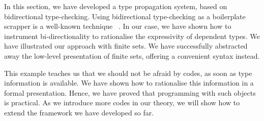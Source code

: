 In this section, we have developed a type propagation system, based
on bidirectional type-checking. Using bidirectional type-checking as a
boilerplate scrapper is a well-known technique~\cite{who?} . In our case, we have shown how to instrument
bi-directionality to rationalise the expressivity of dependent
types. We have illustrated our approach with finite sets. We have
successfully abstracted away the low-level presentation of finite
sets, offering a convenient syntax instead.

This example teaches us that we should not be afraid by codes, as soon
as type information is available. We have shown how to rationalise
this information in a formal presentation. Hence, we have proved that
programming with such objects is practical. As we introduce more codes
in our theory, we will show how to extend the framework we have
developed so far.

